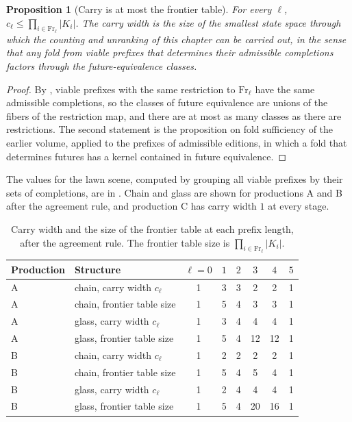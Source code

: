 \documentclass[11pt,twoside,openright]{book}
\theoremstyle{plain}
\newtheorem{proposition}[theorem]{Proposition}
\theoremstyle{definition}
\theoremstyle{remark}
\newcommand{\Fr}{\mathrm{Fr}}
\begin{document}
\begin{proposition}[Carry is at most the frontier table]\label{prop:carryfront}
For every $\ell$, $c_\ell\le\prod_{i\in\Fr_\ell}\lvert K_i\rvert$. The carry width is the size of the smallest state space through which the counting and unranking of this chapter can be carried out, in the sense that any fold from viable prefixes that determines their admissible completions factors through the future-equivalence classes.
\end{proposition}

\begin{proof}
By , viable prefixes with the same restriction to $\Fr_\ell$ have the same admissible completions, so the classes of future equivalence are unions of the fibers of the restriction map, and there are at most as many classes as there are restrictions. The second statement is the proposition on fold sufficiency of the earlier volume, applied to the prefixes of admissible editions, in which a fold that determines futures has a kernel contained in future equivalence.
\end{proof}

The values for the lawn scene, computed by grouping all viable prefixes by their sets of completions, are in . Chain and glass are shown for productions A and B after the agreement rule, and production C has carry width $1$ at every stage.

\begin{table}[ht]
\centering
\begin{tabular}{@{}llcccccc@{}}
\toprule
Production & Structure & $\ell=0$ & $1$ & $2$ & $3$ & $4$ & $5$\\
\midrule
A & chain, carry width $c_\ell$ & 1 & 3 & 3 & 2 & 2 & 1\\
A & chain, frontier table size & 1 & 5 & 4 & 3 & 3 & 1\\
A & glass, carry width $c_\ell$ & 1 & 3 & 4 & 4 & 4 & 1\\
A & glass, frontier table size & 1 & 5 & 4 & 12 & 12 & 1\\
\midrule
B & chain, carry width $c_\ell$ & 1 & 2 & 2 & 2 & 2 & 1\\
B & chain, frontier table size & 1 & 5 & 4 & 5 & 4 & 1\\
B & glass, carry width $c_\ell$ & 1 & 2 & 4 & 4 & 4 & 1\\
B & glass, frontier table size & 1 & 5 & 4 & 20 & 16 & 1\\
\bottomrule
\end{tabular}
\caption{Carry width and the size of the frontier table at each prefix length, after the agreement rule. The frontier table size is $\prod_{i\in\Fr_\ell}\lvert K_i\rvert$.}\label{tab:carry}
\end{table}
\end{document}
